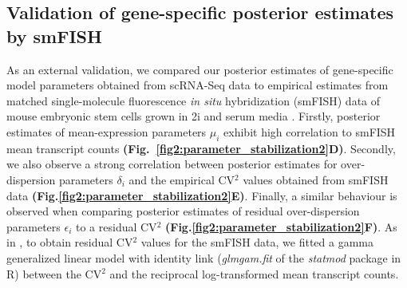 \subsection{Validation of gene-specific posterior estimates by smFISH}

As an external validation, we compared our posterior estimates of gene-specific model parameters obtained from scRNA-Seq data to empirical estimates from matched single-molecule fluorescence \textit{in situ} hybridization (smFISH) data of mouse embryonic stem cells grown in 2i and serum media \citep{Grun2014}. Firstly, posterior estimates of mean-expression parameters $\mu_i$ exhibit high correlation to smFISH mean transcript counts \textbf{(Fig.~\ref{fig2:parameter_stabilization2}D)}. Secondly, we also observe a strong correlation between posterior estimates for over-dispersion parameters $\delta_i$ and the empirical CV$^2$ values obtained from smFISH data \textbf{(Fig.\ref{fig2:parameter_stabilization2}E)}. Finally, a similar behaviour is observed when comparing posterior estimates of residual over-dispersion parameters $\epsilon_i$ to a residual CV$^2$ \textbf{(Fig.\ref{fig2:parameter_stabilization2}F)}. As in \cite{Brennecke2013}, to obtain residual CV$^2$ values for the smFISH data, we fitted a gamma generalized linear model with identity link (\textit{glmgam.fit} of the \textit{statmod} package in R) between the CV$^2$ and the reciprocal log-transformed mean transcript counts.

\newpage

